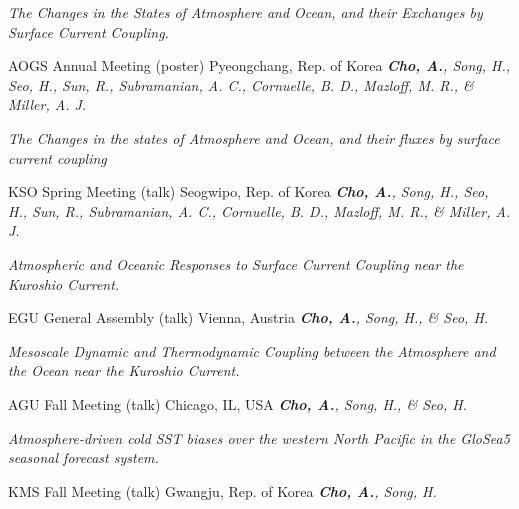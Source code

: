 \documentclass[11pt,usletter,sans]{moderncv}
\begin{document}
        {\parbox[t]{0.7\textwidth}{\textit{The Changes in the States of Atmosphere and Ocean, and their Exchanges by Surface Current Coupling.}}}
        {AOGS Annual Meeting (poster)}   %
        {Pyeongchang, Rep. of Korea}           %
        {}
        {}
        {\emph{\textbf{Cho, A.}, Song, H., Seo, H., Sun, R., Subramanian, A. C., Cornuelle, B. D., Mazloff, M. R., 
 \& Miller, A. J.}}
        
\vspace{0.5em}

        {\parbox[t]{0.7\textwidth}{\textit{The Changes in the states of Atmosphere and Ocean, and their fluxes by surface current coupling}}}
        {KSO Spring Meeting (talk)}   %
        {Seogwipo, Rep. of Korea}           %
        {}
        {}
        {\emph{\textbf{Cho, A.}, Song, H., Seo, H., Sun, R., Subramanian, A. C., Cornuelle, B. D., Mazloff, M. R., 
 \& Miller, A. J.}}
        
\vspace{0.5em}

        {\parbox[t]{0.8\textwidth}{\textit{Atmospheric and Oceanic Responses to Surface Current Coupling near the Kuroshio Current.}}}
        {EGU General Assembly (talk)}   %
        {Vienna, Austria}           %
        {}
        {}
        {\emph{\textbf{Cho, A.}, Song, H., \& Seo, H.}}
        
\vspace{0.5em}


        {\parbox[t]{0.8\textwidth}{\textit{Mesoscale Dynamic and Thermodynamic Coupling between the Atmosphere and the Ocean near the Kuroshio Current.}}}
        {AGU Fall Meeting (talk)}   %
        {Chicago, IL, USA}            %
        {}
        {\emph{\textbf{Cho, A.}, Song, H., \& Seo, H.}}
        
\vspace{0.5em}

        {\parbox[t]{0.7\textwidth}{\textit{Atmosphere-driven cold SST biases over the western North Pacific in the GloSea5 seasonal forecast system.}}}
        {KMS Fall Meeting (talk)}   %
        {Gwangju, Rep. of Korea}            %
        {}
        {\emph{\textbf{Cho, A.}, Song, H.}}
        
\end{document}
